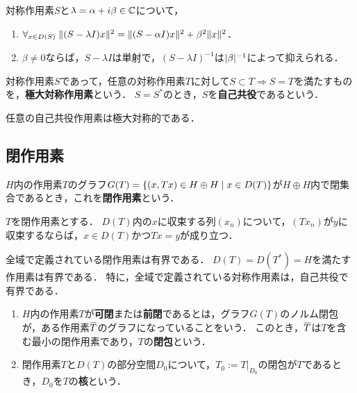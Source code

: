 \documentclass[uplatex,dvipdfmx]{jsreport}
\begin{document}
\begin{lemma}
    対称作用素$S$と$\lambda=\alpha+i\beta\in\mathbb{C}$について，
    \begin{enumerate}
        \item $\forall_{x\in D(S)}\;\|(S-\lambda I)x\|^2=\|(S-\alpha I)x\|^2+\beta^2\|x\|^2$．
        \item $\beta\ne0$ならば，$S-\lambda I$は単射で，$(S-\lambda I)^{-1}$は$\lvert\beta\rvert^{-1}$によって抑えられる．
    \end{enumerate}
\end{lemma}

\begin{definition}
    対称作用素$S$であって，任意の対称作用素$T$に対して$S\subset T\Rightarrow S=T$を満たすものを，\textbf{極大対称作用素}という．
    $S=S^*$のとき，$S$を\textbf{自己共役}であるという．
\end{definition}

\begin{lemma}
    任意の自己共役作用素は極大対称的である．
\end{lemma}

\subsection{閉作用素}

\begin{definition}
    $H$内の作用素$T$のグラフ$G(T)=\left\{(x,Tx)\in H\oplus H\mid x\in D(T)\right\}$が$H\oplus H$内で閉集合であるとき，これを\textbf{閉作用素}という．
\end{definition}

\begin{lemma}
    $T$を閉作用素とする．
    $D(T)$内の$x$に収束する列$(x_n)$について，$(Tx_n)$が$y$に収束するならば，$x\in D(T)$かつ$Tx=y$が成り立つ．
\end{lemma}
\begin{example}
    全域で定義されている閉作用素は有界である．
    $D(T)=D(T^*)=H$を満たす作用素は有界である．
    特に，全域で定義されている対称作用素は，自己共役で有界である．
\end{example}

\begin{definition}\mbox{}
    \begin{enumerate}
        \item $H$内の作用素$T$が\textbf{可閉}または\textbf{前閉}であるとは，グラフ$G(T)$のノルム閉包が，ある作用素$\overline{T}$のグラフになっていることをいう．
        このとき，$\overline{T}$は$T$を含む最小の閉作用素であり，$T$の\textbf{閉包}という．
        \item 閉作用素$T$と$D(T)$の部分空間$D_0$について，$T_0:=T|_{D_0}$の閉包が$T$であるとき，$D_0$を$T$の\textbf{核}という．
    \end{enumerate}
\end{definition}
\end{document}
